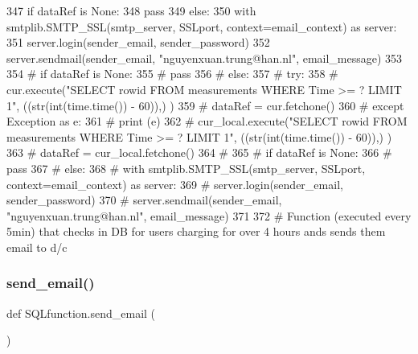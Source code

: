 \begin{DoxyCode}
347             \textcolor{keywordflow}{if} dataRef \textcolor{keywordflow}{is} \textcolor{keywordtype}{None}:
348                 \textcolor{keywordflow}{pass}
349             \textcolor{keywordflow}{else}:
350                 with smtplib.SMTP\_SSL(smtp\_server, SSLport, context=email\_context) \textcolor{keyword}{as} server:
351                     server.login(sender\_email, sender\_password)                    
352                     server.sendmail(sender\_email, \textcolor{stringliteral}{"nguyenxuan.trung@han.nl"}, email\_message)
353             
354 \textcolor{comment}{#     if dataRef is None:}
355 \textcolor{comment}{#         pass}
356 \textcolor{comment}{#     else:}
357 \textcolor{comment}{#         try:}
358 \textcolor{comment}{#             cur.execute("SELECT rowid FROM measurements WHERE Time >= ? LIMIT 1", ((str(int(time.time())
       - 60)),) )}
359 \textcolor{comment}{#             dataRef = cur.fetchone()}
360 \textcolor{comment}{#         except Exception as e:}
361 \textcolor{comment}{#             print (e)}
362 \textcolor{comment}{#             cur\_local.execute("SELECT rowid FROM measurements WHERE Time >= ? LIMIT 1",
       ((str(int(time.time()) - 60)),) )}
363 \textcolor{comment}{#             dataRef = cur\_local.fetchone()}
364 \textcolor{comment}{#             }
365 \textcolor{comment}{#         if dataRef is None:}
366 \textcolor{comment}{#             pass}
367 \textcolor{comment}{#         else:}
368 \textcolor{comment}{#             with smtplib.SMTP\_SSL(smtp\_server, SSLport, context=email\_context) as server:}
369 \textcolor{comment}{#                 server.login(sender\_email, sender\_password)                    }
370 \textcolor{comment}{#                 server.sendmail(sender\_email, "nguyenxuan.trung@han.nl", email\_message)}
371 
372 \textcolor{comment}{# Function (executed every 5min) that checks in DB for users charging for over 4 hours ands sends them
       email to d/c}
\end{DoxyCode}
\mbox{\label{namespace_s_q_lfunction_a526fa5bc764d15233b0cc1880fc33f83}} 
\subsubsection{send\+\_\+email()}
{\footnotesize\ttfamily def S\+Q\+Lfunction.\+send\+\_\+email (\begin{DoxyParamCaption}{ }\end{DoxyParamCaption})}



